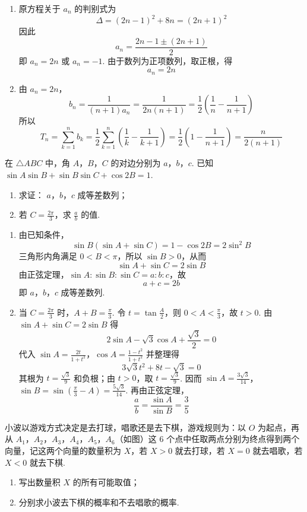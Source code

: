 \begin{solution}
\begin{enumerate}
\item 原方程关于 \(a_n\) 的判别式为
\[
\Delta=(2n-1)^{2}+8n=(2n+1)^{2}
\]
因此
\[
a_n=\frac{2n-1\pm(2n+1)}{2}
\]
即 \(a_n=2n\) 或 \(a_n=-1\). 由于数列为正项数列，取正根，得
\[
a_n=2n
\]
\item 由 \(a_n=2n\)，
\[
b_n=\frac{1}{(n+1)a_n}=\frac{1}{2n(n+1)}
 =\frac12\left(\frac1n-\frac1{n+1}\right)
\]
所以
\[
T_n=\sum_{k=1}^{n}b_k
 =\frac12\sum_{k=1}^{n}\left(\frac1k-\frac1{k+1}\right)
 =\frac12\left(1-\frac1{n+1}\right)
 =\frac{n}{2(n+1)}
\]
\end{enumerate}
\end{solution}

\begin{problem}
在 \(\triangle ABC\) 中，角 \(A\)，\(B\)，\(C\) 的对边分别为 \(a\)，\(b\)，\(c\). 已知 \(\sin A \sin B + \sin B \sin C + \cos 2B = 1\).
\begin{enumerate}
\item 求证： \(a\)，\(b\)，\(c\) 成等差数列；
\item 若 \(C = \frac{2\pi}{3}\)，求 \(\frac{a}{b}\) 的值.
\end{enumerate}
\end{problem}

\begin{solution}
\begin{enumerate}
\item 由已知条件，
\[
\sin B(\sin A+\sin C)=1-\cos2B=2\sin^{2}B
\]
三角形内角满足 \(0<B<\pi\)，所以 \(\sin B>0\)，从而
\[
\sin A+\sin C=2\sin B
\]
由正弦定理，\(\sin A:\sin B:\sin C=a:b:c\)，故
\[
a+c=2b
\]
即 \(a\)，\(b\)，\(c\) 成等差数列.
\item 当 \(C=\frac{2\pi}{3}\) 时，\(A+B=\frac\pi3\). 令 \(t=\tan\frac A2\)，则 \(0<A<\frac\pi3\)，故 \(t>0\). 由 \(\sin A+\sin C=2\sin B\) 得
\[
2\sin A-\sqrt3\cos A+\frac{\sqrt3}{2}=0
\]
代入
\(\sin A=\frac{2t}{1+t^{2}}\)，\(\cos A=\frac{1-t^{2}}{1+t^{2}}\)
并整理得
\[
3\sqrt3t^{2}+8t-\sqrt3=0
\]
其根为 \(t=\frac{\sqrt3}{9}\) 和负根；由 \(t>0\)，取 \(t=\frac{\sqrt3}{9}\). 因而
\(\sin A=\frac{3\sqrt3}{14}\)，\(\sin B=\sin\left(\frac\pi3-A\right)=\frac{5\sqrt3}{14}\).
再由正弦定理，
\[
\frac ab=\frac{\sin A}{\sin B}=\frac35
\]
\end{enumerate}
\end{solution}

\begin{problem}
小波以游戏方式决定是去打球，唱歌还是去下棋，游戏规则为：以 \(O\) 为起点，再从 \(A_{1}\)，\(A_{2}\)，\(A_{3}\)，\(A_{4}\)，\(A_{5}\)，\(A_{6}\)（如图）这 \(6\) 个点中任取两点分别为终点得到两个向量，记这两个向量的数量积为 \(X\)，若 \(X > 0\) 就去打球，若 \(X = 0\) 就去唱歌，若 \(X < 0\) 就去下棋.
\begin{enumerate}
\item 写出数量积 \(X\) 的所有可能取值；
\item 分别求小波去下棋的概率和不去唱歌的概率.
\end{enumerate}
\end{problem}

